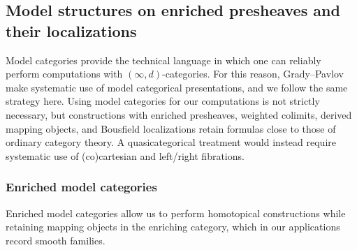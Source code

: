 \documentclass{amsart}
\theoremstyle{definition}
\numberwithin{equation}{subsection}
\numberwithin{subsubsection}{subsection}
\begin{document}
\subsection{Model structures on enriched presheaves and their
localizations}\label{subsec:model.categories}

Model categories provide the technical language in which one can
reliably perform computations with \((\infty,d)\)-categories. For this reason,
Grady--Pavlov~\cite{GP23,GP22,GP26} make systematic use of model
categorical presentations, and we follow the same strategy here. Using model
categories for our computations is not strictly necessary, but constructions
with enriched presheaves, weighted
colimits, derived mapping objects, and Bousfield localizations retain formulas
close to those of ordinary category theory. A quasicategorical treatment would
instead require systematic use of (co)cartesian and left/right fibrations.

\subsubsection{Enriched model categories}
Enriched model categories allow us to perform homotopical constructions while
retaining mapping objects in the enriching category, which in our applications
record smooth families.
\end{document}
